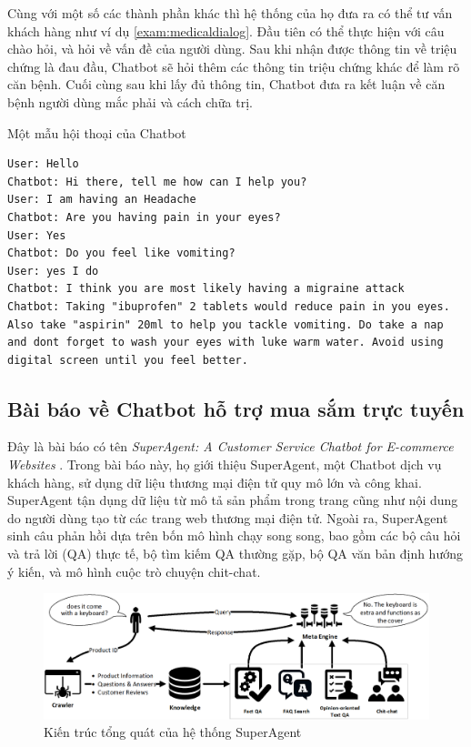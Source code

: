 Cùng với một số các thành phần khác thì hệ thống của họ đưa ra có thể
tư vấn khách hàng như ví dụ \ref{exam:medicaldialog}. Đầu tiên có thể
thực hiện với câu chào hỏi, và hỏi về vấn đề của người dùng. Sau khi
nhận được thông tin về triệu chứng là đau đầu, Chatbot sẽ hỏi thêm các
thông tin triệu chứng khác để làm rõ căn bệnh. Cuối cùng sau khi lấy
đủ thông tin, Chatbot đưa ra kết luận về căn bệnh người dùng mắc phải
và cách chữa trị.

\renewcommand{\textboxenvname}{Ví dụ}
\begin{textbox}{Một mẫu hội thoại của Chatbot}
\begin{Verbatim}[breaklines=true, breakanywhere=true]
User: Hello
Chatbot: Hi there, tell me how can I help you?
User: I am having an Headache
Chatbot: Are you having pain in your eyes?
User: Yes
Chatbot: Do you feel like vomiting?
User: yes I do
Chatbot: I think you are most likely having a migraine attack
Chatbot: Taking "ibuprofen" 2 tablets would reduce pain in you eyes. Also take "aspirin" 20ml to help you tackle vomiting. Do take a nap and dont forget to wash your eyes with luke warm water. Avoid using digital screen until you feel better.
\end{Verbatim}
\end{textbox}

\subsection{Bài báo về Chatbot hỗ trợ mua sắm trực tuyến}
Đây là bài báo có tên \textit{SuperAgent: A Customer Service Chatbot
for E-commerce Websites} \cite{superagent}. Trong bài báo này, họ
giới thiệu SuperAgent, một Chatbot dịch vụ khách hàng, sử dụng dữ liệu
thương mại điện tử quy mô lớn và công khai. SuperAgent tận dụng dữ liệu
từ mô tả sản phẩm trong trang cũng như nội dung do người dùng tạo từ
các trang web thương mại điện tử. Ngoài ra, SuperAgent sinh câu phản hồi
dựa trên bốn mô hình chạy song song, bao gồm các bộ câu hỏi và trả lời
(QA) thực tế, bộ tìm kiếm QA thường gặp, bộ QA văn bản định hướng ý kiến,
và mô hình cuộc trò chuyện chit-chat.

\begin{figure}[ht]
    \centering
    \includegraphics[width=1\textwidth]{thesis/chatbot/congtrinh/img/superagent.png}
    \caption{Kiến trúc tổng quát của hệ thống SuperAgent}
    \label{fig:superagent}
\end{figure}

